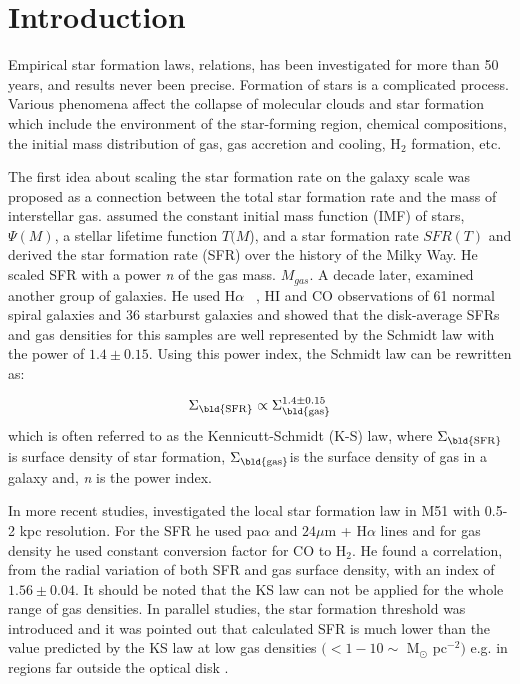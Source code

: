 \documentclass[useAMS,usenatbib]{mn2e}
\newcommand \sigmagas    {$\Sigma_{\rm \bld {gas }}$}
\newcommand \eqsigmagas    {\Sigma_{\rm \bld {gas }}}
\newcommand \sigmasfr     {$\Sigma_{\rm \bld {SFR }}$}
\newcommand \eqsigmasfr     {\Sigma_{\rm \bld {SFR }}}
\newcommand \halpha    {H$\alpha$ \ }
\begin{document}
\section{Introduction}
\label{sec:intro} %

Empirical star formation laws, relations, has been investigated for more than 50 years, and results never been precise. Formation of stars is a complicated process. Various phenomena affect the collapse of molecular clouds and star formation which include the environment of the star-forming region, chemical compositions, the initial mass distribution of gas, gas accretion and cooling, H$_2$ formation, etc. 

The first idea about scaling the star formation rate on the galaxy scale was proposed as a connection between the total star formation rate and the mass of interstellar gas. \cite{Schmidt59} assumed the constant initial mass function (IMF) of stars, $\Psi (M)$, a stellar lifetime function {$T(M$)}, and a star formation rate {$SFR(T)$} and derived the star formation rate (SFR) over the history of the Milky Way. He scaled SFR with a power {\it n} of the gas mass. $M_{gas}$. %
A decade later, \cite{Kennicutt98a} examined another group of galaxies. He used \halpha, HI and CO observations of 61 normal spiral galaxies and 36 starburst galaxies and showed that the disk-average SFRs and gas densities for this samples are well represented by the Schmidt law with the power of $1.4 \pm 0.15$. Using this power index, the Schmidt law can be rewritten as:

\begin{equation}
\eqsigmasfr \propto \eqsigmagas^{1.4\pm0.15}
\end{equation}
which is often referred to as the Kennicutt-Schmidt (K-S) law, where \sigmasfr is surface density of star formation, \sigmagas is the surface density of gas in a galaxy and, {\it n} is the power index.


In more recent studies, \cite{Kennicutt08} investigated the local star formation law in M51 with 0.5-2 kpc resolution. For the SFR he used pa${\alpha}$ and $24\mu$m + H${\alpha}$ lines and for gas density he used constant conversion factor for CO to H$_2$. He found a correlation, from the radial variation of both SFR and gas surface density, with an index of $1.56 \pm 0.04$.
It should be noted that the KS law can not be applied for the whole range of gas densities. In parallel studies, the star formation threshold was introduced and it was pointed out that calculated SFR is much lower than the value predicted by the KS law at low gas densities $( < 1-10\sim$ M$_{\odot}$ pc$^{-2})$ e.g. in regions far outside the optical disk \citep[e.g.,][]{Martin01, Bigiel08}.
\end{document}
